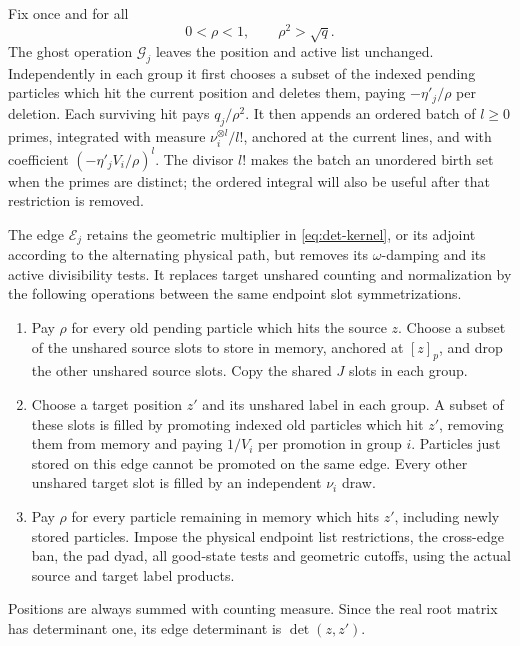 Fix once and for all
\begin{equation}\label{mem:rho}
 0<\rho<1,\qquad \rho^2>\sqrt q.
\end{equation}
The ghost operation $\mathcal G_j$ leaves the position and active list
unchanged. Independently in each group it first chooses a subset of
the indexed pending particles which hit the current position and
deletes them, paying $-\eta'_j/\rho$ per deletion. Each surviving hit
pays $q_j/\rho^2$. It then appends an ordered batch of $l\ge0$ primes,
integrated with measure $\nu_i^{\otimes l}/l!$, anchored at the current
lines, and with coefficient $(-\eta'_jV_i/\rho)^l$.
The divisor $l!$ makes the batch an unordered birth set when the primes
are distinct; the ordered integral will also be useful after that
restriction is removed.

The edge $\mathcal E_j$ retains the geometric multiplier in
\eqref{eq:det-kernel}, or its adjoint according to the alternating
physical path, but removes its $\omega$-damping and its active
divisibility tests. It replaces target unshared counting and
normalization by the following operations between the same endpoint
slot symmetrizations.
\begin{enumerate}[label=(\roman*)]
 \item Pay $\rho$ for every old pending particle which hits the source
 $z$. Choose a subset of the unshared source slots to store in memory,
 anchored at $[z]_p$, and drop the other unshared source slots. Copy the
 shared $J$ slots in each group.
 \item Choose a target position $z'$ and its unshared label in each
 group. A subset of these slots is filled by promoting indexed old
 particles which hit $z'$, removing them from memory and paying
 $1/V_i$ per promotion in group $i$. Particles just stored on this edge
 cannot be promoted on the same edge. Every other unshared target slot
 is filled by an independent $\nu_i$ draw.
 \item Pay $\rho$ for every particle remaining in memory which hits
 $z'$, including newly stored particles. Impose the physical endpoint
 list restrictions, the cross-edge ban, the pad dyad, all good-state
 tests and geometric cutoffs, using the actual source and target label
 products.
\end{enumerate}
Positions are always summed with counting measure. Since the real
root matrix has determinant one, its edge determinant is
$\det(z,z')$.

